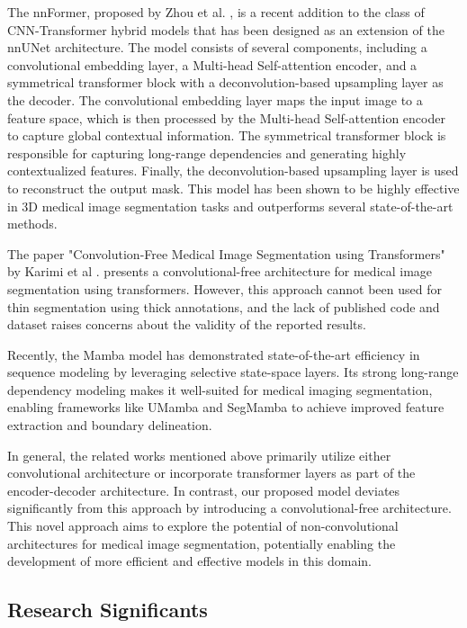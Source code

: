 \documentclass{article}
\begin{document}
The nnFormer, proposed by Zhou et al. \cite{23}, is a recent addition to the class of CNN-Transformer hybrid models that has been designed as an extension of the nnUNet architecture. The model consists of several components, including a convolutional embedding layer, a Multi-head Self-attention encoder, and a symmetrical transformer block with a deconvolution-based upsampling layer as the decoder. The convolutional embedding layer maps the input image to a feature space, which is then processed by the Multi-head Self-attention encoder to capture global contextual information. The symmetrical transformer block is responsible for capturing long-range dependencies and generating highly contextualized features. Finally, the deconvolution-based upsampling layer is used to reconstruct the output mask. This model has been shown to be highly effective in 3D medical image segmentation tasks and outperforms several state-of-the-art methods.

The paper "Convolution-Free Medical Image Segmentation using Transformers" by Karimi et al \cite{30}. presents a convolutional-free architecture for medical image segmentation using transformers. However, this approach cannot been used for thin segmentation using thick annotations, and the lack of published code and dataset raises concerns about the validity of the reported results.

Recently, the Mamba model \cite{zhang2024infinimotion,zhang2024kmm,zhang2024motion} has demonstrated state-of-the-art efficiency in sequence modeling by leveraging selective state-space layers. Its strong long-range dependency modeling makes it well-suited for medical imaging segmentation, enabling frameworks like UMamba and SegMamba to achieve improved feature extraction and boundary delineation.

In general, the related works mentioned above primarily utilize either convolutional architecture or incorporate transformer layers as part of the encoder-decoder architecture. In contrast, our proposed model deviates significantly from this approach by introducing a convolutional-free architecture. This novel approach aims to explore the potential of non-convolutional architectures for medical image segmentation, potentially enabling the development of more efficient and effective models in this domain.

\subsection{Research Significants}
\end{document}
